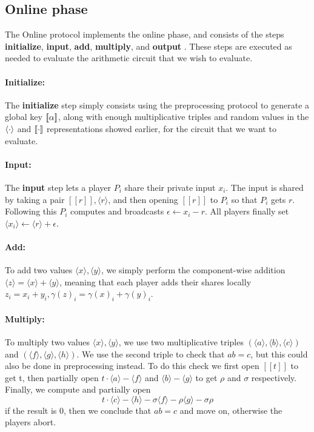 \documentclass[../main.tex]{subfiles}
\begin{document}
\subsection{Online phase} \label{subsection: Online}
The Online protocol implements the online phase, and consists of the steps \textbf{initialize}, \textbf{input}, \textbf{add}, \textbf{multiply}, and \textbf{output} \cite{damgaard2012multiparty}.
These steps are executed as needed to evaluate the arithmetic circuit that we wish to evaluate.

\paragraph{Initialize:}
The \textbf{initialize} step simply consists using the preprocessing protocol to generate a global key $[\![ \alpha ]\!]$, along with enough multiplicative triples and random values in the $\left\langle \cdot \right\rangle$ and $[\![ \cdot ]\!]$ representations showed earlier, for the circuit that we want to evaluate.

\paragraph{Input:}
The \textbf{input} step lets a player $P_i$ share their private input $x_i$. The input is shared by taking a pair $[\![ r ]\!], \langle r \rangle$, and then opening $[\![ r ]\!]$ to $P_i$ so that $P_i$ gets $r$. Following this $P_i$ computes and broadcasts $\epsilon \leftarrow x_i - r$. All players finally set $\langle x_i \rangle \leftarrow \langle r \rangle + \epsilon$.

\paragraph{Add:}
To add two values $\langle x \rangle, \langle y \rangle$, we simply perform the component-wise addition $\langle z \rangle = \langle x \rangle + \langle y \rangle$, meaning that each player adds their shares locally $z_i = x_i + y_i, \gamma(z)_i = \gamma(x)_i + \gamma(y)_i$.

\paragraph{Multiply:}
To multiply two values $\langle x \rangle, \langle y \rangle$, we use two multiplicative triples $(\langle a \rangle, \langle b \rangle, \langle c \rangle)$ and $(\langle f \rangle, \langle g \rangle, \langle h \rangle)$. We use the second triple to check that $ab = c$, but this could also be done in preprocessing instead.
To do this check we first open $[\![ t ]\!]$ to get t, then partially open $t \cdot \langle a \rangle - \langle f \rangle$ and $\langle b \rangle - \langle g \rangle$ to get $\rho$ and $\sigma$ respectively. 
Finally, we compute and partially open $$t \cdot \langle c \rangle - \langle h \rangle - \sigma \langle f \rangle - \rho \langle g \rangle - \sigma \rho$$
if the result is $0$, then we conclude that $ab = c$ and move on, otherwise the players abort.
\end{document}
